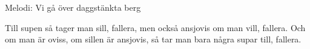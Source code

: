 \begin{song}

\begin{songmeta}
Melodi: Vi gå över daggstänkta berg
\end{songmeta}

\begin{songtext}
Till supen så tager man sill, fallera,
men också ansjovis om man vill, fallera.
Och om man är oviss,
om sillen är ansjovis,
så tar man bara några supar till, fallera.
\end{songtext}
\end{song}
